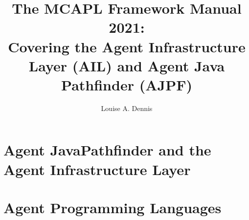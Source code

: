 \documentclass[a4]{book}
\author{Louise A. Dennis}
\title{The MCAPL Framework Manual 2021: \\
Covering the Agent Infrastructure Layer (AIL) and Agent Java Pathfinder (AJPF)}
\begin{document}
\maketitle

\tableofcontents

\SetJava






\part{Agent JavaPathfinder and the Agent Infrastructure Layer}







\part{Agent Programming Languages}













\printindex
\end{document}
